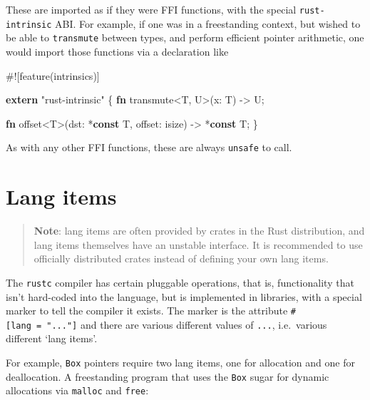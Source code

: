 \documentclass[a4paper,]{book}
\newenvironment{Shaded}{\begin{snugshade}}{\end{snugshade}}
\newcommand{\KeywordTok}[1]{\textcolor[rgb]{0.13,0.29,0.53}{\textbf{{#1}}}}
\newcommand{\DataTypeTok}[1]{\textcolor[rgb]{0.13,0.29,0.53}{{#1}}}
\newcommand{\StringTok}[1]{\textcolor[rgb]{0.31,0.60,0.02}{{#1}}}
\newcommand{\AttributeTok}[1]{\textcolor[rgb]{0.77,0.63,0.00}{{#1}}}
\newcommand{\NormalTok}[1]{{#1}}
\begin{document}
These are imported as if they were FFI functions, with the special
\texttt{rust-intrinsic} ABI. For example, if one was in a freestanding
context, but wished to be able to \texttt{transmute} between types, and
perform efficient pointer arithmetic, one would import those functions
via a declaration like

\begin{Shaded}
\begin{Highlighting}[]
\AttributeTok{#![}\NormalTok{feature}\AttributeTok{(}\NormalTok{intrinsics}\AttributeTok{)]}

\KeywordTok{extern} \StringTok{"rust-intrinsic"} \NormalTok{\{}
    \KeywordTok{fn} \NormalTok{transmute<T, U>(x: T) -> U;}

    \KeywordTok{fn} \NormalTok{offset<T>(dst: *}\KeywordTok{const} \NormalTok{T, offset: }\DataTypeTok{isize}\NormalTok{) -> *}\KeywordTok{const} \NormalTok{T;}
\NormalTok{\}}
\end{Highlighting}
\end{Shaded}

As with any other FFI functions, these are always \texttt{unsafe} to
call.

\section{Lang items}\label{sec--lang-items}

\begin{quote}
\textbf{Note}: lang items are often provided by crates in the Rust
distribution, and lang items themselves have an unstable interface. It
is recommended to use officially distributed crates instead of defining
your own lang items.
\end{quote}

The \texttt{rustc} compiler has certain pluggable operations, that is,
functionality that isn't hard-coded into the language, but is
implemented in libraries, with a special marker to tell the compiler it
exists. The marker is the attribute \texttt{\#{[}lang\ =\ "..."{]}} and
there are various different values of \texttt{...}, i.e.~various
different `lang items'.

For example, \texttt{Box} pointers require two lang items, one for
allocation and one for deallocation. A freestanding program that uses
the \texttt{Box} sugar for dynamic allocations via \texttt{malloc} and
\texttt{free}:
\end{document}
